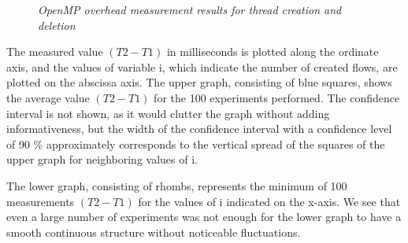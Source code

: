 {\begin{figure}[H]
		\caption{\textit{OpenMP overhead measurement results for thread creation and deletion}}
		\label{OpenMPExpensesOnCreatingThreads:image}
	\end{figure} 
	\par The measured value $(T2 - T1)$ in milliseconds is plotted along the ordinate axis, and the values of variable i, which indicate the number of created flows, are plotted on the abscissa axis. The upper graph, consisting of blue squares, shows the average value $(T2 - T1)$ for the 100 experiments performed. The confidence interval is not shown, as it would clutter the graph without adding informativeness, but the width of the confidence interval with a confidence level of 90 \% approximately corresponds to the vertical spread of the squares of the upper graph for neighboring values of i.
	\par The lower graph, consisting of rhombs, represents the minimum of 100 measurements $(T2 - T1)$ for the values of i indicated on the x-axis. We see that even a large number of experiments was not enough for the lower graph to have a smooth continuous structure without noticeable fluctuations.

}